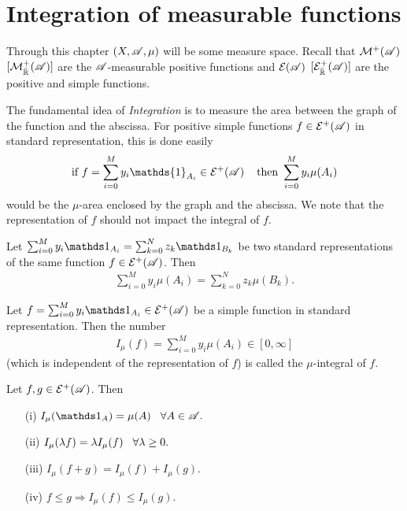 \section{Integration of measurable functions}
Through this chapter $(X,\mathscr{A},\mu)$ will be some measure space. Recall that $\mathcal M^+(\mathscr{A})$
$[\mathcal M^+_{\bar{\mathbb{R}}}(\mathscr{A})]$ are the
$\mathscr{A}$-measurable positive functions and $\mathcal E(\mathscr{A})$ $[\mathcal E^+_{\bar{\mathbb{R}}}(\mathscr{A})]$ are the positive and simple functions.

The fundamental idea of \textit{Integration} is to measure the area between the graph
of the function and the abscissa. For positive simple functions $f\in\mathcal E^+(\mathscr{A})$ in standard 
representation, this is done easily
\begin{align}
    \text{if  } f=\sum_{i=0}^M y_i \mathds{1}_{A_i}\in \E^+(\A)\hspace{4mm} \text{then  } \sum_{i=0}^{M}y_i\mu(A_i)
\end{align}
would be the $\mu$-area enclosed by the graph and the abscissa. We note that 
the representation of $f$ should not impact the integral of $f$.

\begin{lemma}
    Let $\sum_{i=0}^{M} y_i\one_{A_i} =\sum_{k=0}^{N} z_k\one_{B_k} $ be two standard representations
    of the same function $f\in\mathcal{E}^+(\mathscr{A})$. Then 
    \begin{align}
        \sum_{i=0}^{M} y_i\mu(A_i) =\sum_{k=0}^{N} z_k\mu(B_k).
    \end{align}
\end{lemma}


\begin{definition}
    Let $f=\sum_{i=0}^{M} y_i\one_{A_i}\in\E^+(\A)$ be a simple function in standard representation.
    Then the number
    \begin{align}
    I_\mu(f) = \sum_{i=0}^{M} y_i\mu(A_i)\in[0,\infty]    
    \end{align}
    (which is independent of the representation of $f$) is called the $\mu$-integral of $f$.
\end{definition}

\begin{proposition}
    Let $f,g\in\mathcal{E}^+(\mathscr{A})$. Then
    \begin{enumerate}
        \item[(i)] $I_\mu(\one_A)=\mu(A)\hspace{3mm}\forall A\in\A.$
        \item[(ii)] $I_\mu(\lambda f)=\lambda I_\mu(f)\hspace{3mm} \forall \lambda\geq 0.$
        \item[(iii)] $I_\mu(f+g) = I_\mu(f)+I_\mu(g).$
        \item[(iv)]  $f\leq g\Rightarrow I_\mu(f)\leq I_\mu(g).$
    \end{enumerate}
\end{proposition}

